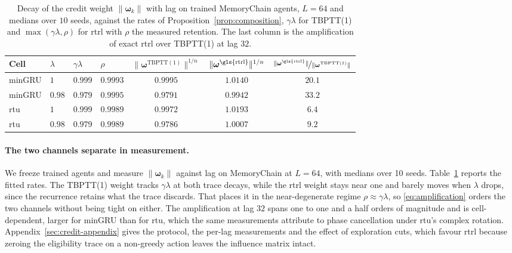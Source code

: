 \documentclass{article}
\begin{document}
\begin{table}[t]
\centering
\caption{Decay of the credit weight $\|\boldsymbol{\omega}_k\|$ with lag on trained MemoryChain
agents, $L{=}64$ and medians over $10$ seeds, against the rates of
Proposition~\ref{prop:composition}, $\gamma\lambda$ for TBPTT(1) and $\max(\gamma\lambda,\rho)$
for \gls{rtrl} with $\rho$ the measured retention. The last column is the amplification of exact
\gls{rtrl} over TBPTT(1) at lag $32$.}
\label{tab:weights}
\small
\setlength{\tabcolsep}{3.8pt}
\begin{tabular}{llllccc}
\toprule
Cell & $\lambda$ & $\gamma\lambda$ & $\rho$ &
$\|\boldsymbol{\omega}^{\mathrm{TBPTT(1)}}\|^{1/n}$ &
$\|\boldsymbol{\omega}^{\mathrm{\gls{rtrl}}}\|^{1/n}$ &
$\nicefrac{\|\boldsymbol{\omega}^{\mathrm{\gls{rtrl}}}\|}{\|\boldsymbol{\omega}^{\mathrm{TBPTT(1)}}\|}$ \\
\midrule
minGRU & $1$    & $0.999$ & $0.9993$ & $0.9995$ & $1.0140$ & $20.1$ \\
minGRU & $0.98$ & $0.979$ & $0.9995$ & $0.9791$ & $0.9942$ & $33.2$ \\
\gls{rtu}    & $1$    & $0.999$ & $0.9989$ & $0.9972$ & $1.0193$ & $6.4$ \\
\gls{rtu}    & $0.98$ & $0.979$ & $0.9989$ & $0.9786$ & $1.0007$ & $9.2$ \\
\bottomrule
\end{tabular}
\end{table}

\paragraph{The two channels separate in measurement.}
\label{sec:weights}
We freeze trained agents and measure $\|\boldsymbol{\omega}_k\|$ against lag on MemoryChain at
$L{=}64$, with medians over 10 seeds. Table~\ref{tab:weights} reports the fitted rates. The
TBPTT(1) weight tracks $\gamma\lambda$ at both trace decays, while the \gls{rtrl} weight stays
near one and barely moves when $\lambda$ drops, since the recurrence retains what the trace
discards. That places it in the near-degenerate regime $\rho \approx \gamma\lambda$, so
\eqref{eq:amplification} orders the two channels without being tight on either. The
amplification at lag $32$ spans one to one and a half orders of magnitude and is cell-dependent,
larger for minGRU than for \gls{rtu}, which the same measurements attribute to phase
cancellation under \gls{rtu}'s complex rotation.
Appendix~\ref{sec:credit-appendix} gives the protocol, the per-lag measurements and the
effect of exploration cuts, which favour \gls{rtrl} because zeroing the eligibility trace on a
non-greedy action leaves the influence matrix intact.
\end{document}
